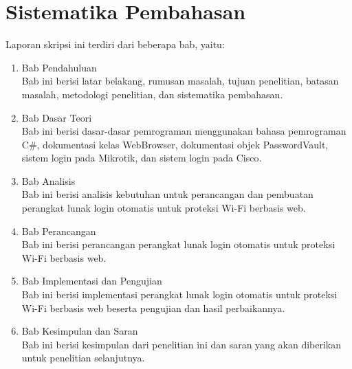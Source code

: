 \section{Sistematika Pembahasan}

Laporan skripsi ini terdiri dari beberapa bab, yaitu:

\begin{enumerate}
    \item{Bab Pendahuluan \\ Bab ini berisi latar belakang, rumusan masalah, tujuan penelitian, batasan masalah, metodologi penelitian, dan sistematika pembahasan.}
    \item{Bab Dasar Teori \\ Bab ini berisi dasar-dasar pemrograman menggunakan bahasa pemrograman C\#, dokumentasi kelas WebBrowser, dokumentasi objek PasswordVault, sistem login pada Mikrotik, dan sistem login pada Cisco.}
    \item{Bab Analisis \\ Bab ini berisi analisis kebutuhan untuk perancangan dan pembuatan perangkat lunak login otomatis untuk proteksi Wi-Fi berbasis web.}
    \item{Bab Perancangan \\ Bab ini berisi perancangan perangkat lunak login otomatis untuk proteksi Wi-Fi berbasis web.}
    \item{Bab Implementasi dan Pengujian \\ Bab ini berisi implementasi perangkat lunak login otomatis untuk proteksi Wi-Fi berbasis web beserta pengujian dan hasil perbaikannya.}
    \item{Bab Kesimpulan dan Saran \\ Bab ini berisi kesimpulan dari penelitian ini dan saran yang akan diberikan untuk penelitian selanjutnya.}
\end{enumerate}
